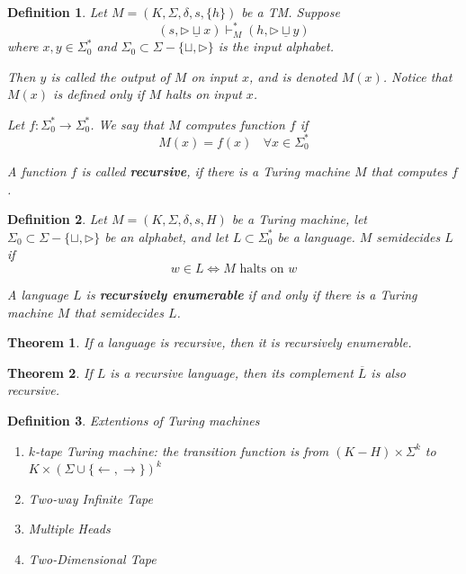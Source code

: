 \documentclass[aps,pra,onecolumn,notitlepage,superscriptaddress]{revtex4-1}
\def\l{\leftarrow}
\def\r{\rightarrow}
\def\u{\underline}
\def\ys{\vdash^*}
\newtheorem{theo}{Theorem}
\newtheorem{defi}{Definition}
\begin{document}
    \begin{defi}
        Let $M = (K, \Sigma, \delta, s, \{h\})$ be a TM. Suppose
        \begin{equation*}
            (s, \rhd \u \sqcup x) \ys_M (h, \rhd \u \sqcup y) 
        \end{equation*}
        where $x,y \in \Sigma_0^*$ and $\Sigma_0 \subset \Sigma - \{ \sqcup, \rhd \}$ is the input alphabet.

        Then $y$ is called the output of $M$ on input $x$, and is denoted $M(x)$. Notice that $M(x)$ is defined only if $M$ halts on input $x$.

        Let $f: \Sigma_0^* \to \Sigma_0^*$. We say that $M$ computes function $f$ if 
        \begin{equation*}
            M(x) = f(x) \ \ \ \ \forall x \in \Sigma_0^*
        \end{equation*}

        A function $f$ is called \textbf{recursive}, if there is a Turing machine $M$ that computes $f$.
    \end{defi}

    \begin{defi}
        Let $M = (K, \Sigma, \delta, s, H)$ be a Turing machine, let $\Sigma_0 \subset \Sigma - \{ \sqcup, \rhd \}$ be an alphabet, and let $L \subset \Sigma_0^*$ be a language. $M$ semidecides $L$ if
        \begin{equation*}
            w \in L \Longleftrightarrow M \text{ halts on } w
        \end{equation*}

        A language $L$ is \textbf{recursively enumerable} if and only if there is a Turing machine $M$ that semidecides $L$.
    \end{defi}

    \begin{theo}
        If a language is recursive, then it is recursively enumerable.
    \end{theo}

    \begin{theo}
        If $L$ is a recursive language, then its complement $\overline L$ is also recursive.
    \end{theo}

    \begin{defi}
        Extentions of Turing machines
        \begin{enumerate}
            \item $k$-tape Turing machine: the transition function is from $(K-H) \times \Sigma^k$ to $K \times (\Sigma \cup \{ \l, \r \})^k$
            \item Two-way Infinite Tape
            \item Multiple Heads
            \item Two-Dimensional Tape
        \end{enumerate}
    \end{defi}
\end{document}
